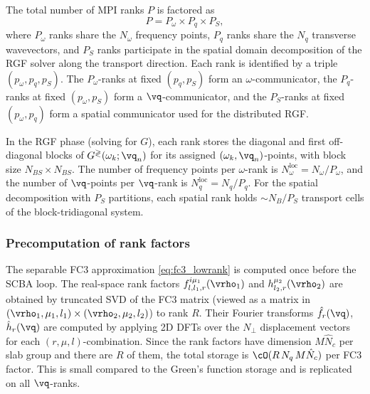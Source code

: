 The total number of MPI ranks $P$ is factored as
\begin{equation}
  P = P_\omega \times P_q \times P_S,
  \label{eq:rank_layout}
\end{equation}
where $P_\omega$ ranks share the $N_\omega$ frequency points,
$P_q$ ranks share the $N_q$ transverse wavevectors, and $P_S$
ranks participate in the spatial domain decomposition of the
RGF solver along the transport direction.  Each rank is
identified by a triple $(p_\omega, p_q, p_S)$.  The
$P_\omega$-ranks at fixed $(p_q, p_S)$ form an
$\omega$-communicator, the $P_q$-ranks at fixed
$(p_\omega, p_S)$ form a $\vq$-communicator, and the
$P_S$-ranks at fixed $(p_\omega, p_q)$ form a
spatial communicator used for the distributed RGF.

In the RGF phase (solving for $G$), each rank stores the
diagonal and first off-diagonal blocks of
$G^{\gtrless}(\omega_k;\vq_n)$ for its assigned
$(\omega_k,\vq_n)$-points, with block size $N_{BS}\times N_{BS}$.
The number of frequency points per $\omega$-rank is
$N_\omega^{\mathrm{loc}} = N_\omega / P_\omega$, and the number
of $\vq$-points per $\vq$-rank is
$N_q^{\mathrm{loc}} = N_q / P_q$.  For the spatial
decomposition with $P_S$ partitions, each spatial rank holds
$\sim N_B/P_S$ transport cells of the block-tridiagonal system.

\subsubsection{Precomputation of rank factors}
\label{sssub:precompute}

The separable FC3 approximation \cref{eq:fc3_lowrank} is
computed once before the SCBA loop.  The real-space rank
factors $f^{i\mu_1}_{l,l_1,r}(\vrho_1)$ and
$h^{\mu_2}_{l_2,r}(\vrho_2)$ are obtained by truncated SVD
of the FC3 matrix (viewed as a matrix in $(\vrho_1,\mu_1,l_1)
\times (\vrho_2,\mu_2,l_2)$) to rank $R$.
Their Fourier transforms $\hat{f}_r(\vq)$, $\hat{h}_r(\vq)$ are
computed by applying 2D DFTs over the $N_\perp$ displacement
vectors for each $(r, \mu, l)$-combination.  Since the rank
factors have dimension $M\hat{N}_c$ per slab group and there
are $R$ of them, the total storage is
$\cO(R\,N_q\,M\hat{N}_c)$ per FC3 factor.  This is small
compared to the Green's function storage and is replicated on
all $\vq$-ranks.

